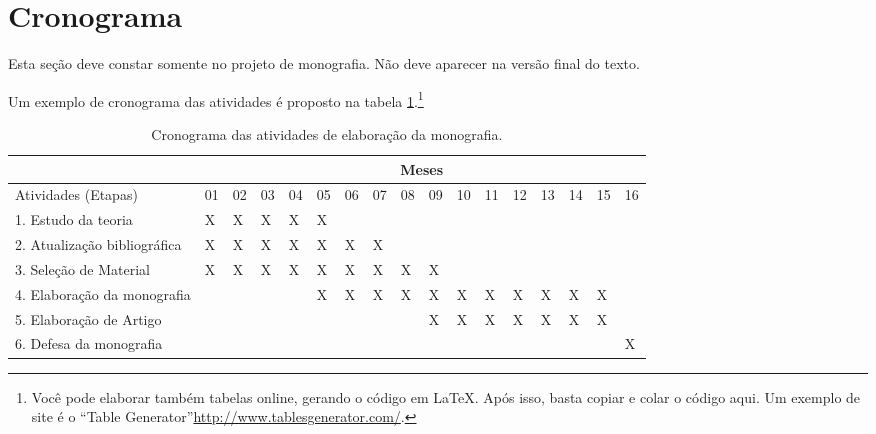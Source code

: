 \section{Cronograma}

Esta seção deve constar somente no projeto de monografia. Não deve aparecer na versão final do texto.



Um exemplo de cronograma das atividades é proposto na tabela \ref{tab:cronograma}.\footnote{Voc{\^e} pode elaborar também tabelas online, gerando o código em \LaTeX. Após isso, basta copiar e colar o código aqui. Um exemplo de site é o ``Table Generator''\url{http://www.tablesgenerator.com/}.}
  
\begin{table}[h]
\ABNTEXfontereduzida
\caption[Cronograma das atividades]{Cronograma das atividades de elaboração da monografia.}
\label{tab:cronograma}
\begin{minipage}{0.3\textwidth}
    \centering
\begin{tabular}{|l|l|l|l|l|l|l|l|l|l|l|l|l|l|l|l|l|}
\hline
                             & \multicolumn{16}{c|}{Meses}                                                   \\ \hline
Atividades (Etapas)          & 01 & 02 & 03 & 04 & 05 & 06 & 07 & 08 & 09 & 10 & 11 & 12 & 13 & 14 & 15 & 16 \\ \hline
1. Estudo da teoria          & X  & X  & X  & X  & X  &    &    &    &    &    &    &    &    &    &    &    \\ \hline
2. Atualização bibliográfica & X  & X  & X  & X  & X  & X  & X  &    &    &    &    &    &    &    &    &    \\ \hline
3. Seleção de Material       & X  & X  & X  & X  & X  & X  & X  & X  & X  &    &    &    &    &    &    &    \\ \hline
4. Elaboração da monografia  &    &    &    &    & X  & X  & X  & X  & X  & X  & X  & X  & X  & X  & X  &    \\ \hline
5. Elaboração de Artigo      &    &    &    &    &    &    &    &    & X  & X  & X  & X  & X  & X  & X  &    \\ \hline
6. Defesa da monografia      &    &    &    &    &    &    &    &    &    &    &    &    &    &    &    & X  \\ \hline
\end{tabular}
  \end{minipage}
\end{table}